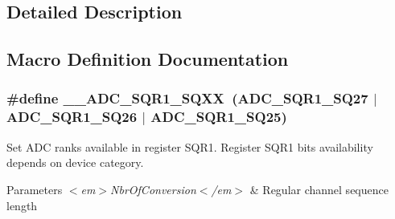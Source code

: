 \subsection{Detailed Description}


\subsection{Macro Definition Documentation}
\hypertarget{group___a_d_c_ex___private___macro_gaaeadff15bb18b98df58b98fc0f57b697}{
\subsubsection[{\-\_\-\-\_\-\-A\-D\-C\-\_\-\-S\-Q\-R1\-\_\-\-S\-Q\-X\-X}]{\setlength{\rightskip}{0pt plus 5cm}\#define \-\_\-\-\_\-\-A\-D\-C\-\_\-\-S\-Q\-R1\-\_\-\-S\-Q\-X\-X~({\bf A\-D\-C\-\_\-\-S\-Q\-R1\-\_\-\-S\-Q27} $\vert$ {\bf A\-D\-C\-\_\-\-S\-Q\-R1\-\_\-\-S\-Q26} $\vert$ {\bf A\-D\-C\-\_\-\-S\-Q\-R1\-\_\-\-S\-Q25})}}\label{group___a_d_c_ex___private___macro_gaaeadff15bb18b98df58b98fc0f57b697}


Set A\-D\-C ranks available in register S\-Q\-R1. Register S\-Q\-R1 bits availability depends on device category. 


\begin{DoxyParams}{Parameters}
{\em $<$em$>$\-Nbr\-Of\-Conversion$<$/em$>$} & Regular channel sequence length \\
\hline
\end{DoxyParams}

